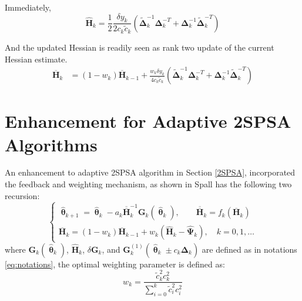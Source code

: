 \documentclass[conference]{IEEEtran}
\newcommand{\bG}{\bm{G}}
\newcommand{\bDelta}{\bm{\Delta}}
\newcommand{\oH}{\bm{\overline{H}}}
\newcommand{\ooH}{\bm{\overline{\overline{H}}}}
\newcommand{\hH}{\bm{\hat{H}}}
\newcommand{\hPsi}{\bm{\hat{\Psi}}}
\newcommand{\htheta}{\bm{\hat{\uptheta}}}
\newcommand{\tDelta}{\bm{\tilde{\Delta}}}
\newcommand{\remove}[1]{}
\begin{document}
Immediately,
\begin{equation} \label{eq:HHat}
\hH_k=\frac{1}{2}\frac{\delta y_k}{2c_k\tilde{c}_k}\left( \tDelta_k^{-1}\bDelta_k^{-T}+\bDelta_k^{-1}\tDelta_k^{-T} \right)
\end{equation}

And the updated Hessian is readily seen as rank two update of
the current Hessian estimate.
\begin{align*}
\oH_k
&= (1 - w_k)\oH_{k-1}
   + \frac{w_k \delta y_k}{4c_k\tilde{c}_k}
     (\tDelta_k^{-1}\bDelta_k^{-T}+\bDelta_k^{-1}\tDelta_k^{-T})
\end{align*}

\remove{
Above gives a rank-2 update from $ \oH_{k-1}^{-1} $ to $ \oH_{k}^{-1} $. Write the sequential recursion of the $ \oH_k^{-1} $ as following:
\begin{equation} \label{eq:2SPSASequentialUpdate}
\begin{dcases}
\bm{B}_k^{-1}
&=\frac{k+1}{k}\oH_{k-1}^{-1}-(\frac{k+1}{k})^2\oH_{k-1}^{-1}\tDelta_k^{-1}\\
&~~~\cdot(b_k^{-1}+\frac{k+1}{k}\bDelta_k^{-T}\oH_{k-1}^{-1}\tDelta_k^{-1})^{-1}\bDelta_k^{-T}\oH_{k-1}^{-1}\\
\oH_k^{-1}
&=\bm{B}_k^{-1}-\bm{B}_k^{-1}\bDelta_k^{-1}\\
&~~~\cdot(b_k^{-1}+\tDelta_k^{-T}\bm{B}_k^{-1}\bDelta_k^{-1})^{-1}\tDelta_k^{-T}\bm{B}_k^{-1}
\end{dcases}
\end{equation}
where
\begin{equation}\label{eq:2SPSAB}
\bm{B}_k=\frac{k}{k+1}\oH_{k-1}+b_k\tDelta_k^{-1}\bDelta_k^{-T}
\end{equation}

Now we analyze the FLOPs of the sequential update \ref{eq:2SPSASequentialUpdate}, compared with the original algorithm \ref{eq:Adaptation}:
}


\section{Enhancement for Adaptive 2SPSA Algorithms} \label{Enhanced 2SPSA}
An enhancement to adaptive 2SPSA algorithm in Section \ref{2SPSA}, incorporated the feedback and weighting mechanism, as shown in Spall \cite{Spall2009} has the following two recursion:
\begin{equation} \label{eq:Enhancement}
\begin{cases}
	\htheta_{k+1}=\htheta_k-a_k\ooH_k^{-1} \bG_k(\htheta_k),\qquad \bm{\ooH}_k=f_k(\oH_k)\\
	\oH_k=(1-w_k)\oH_{k-1}+w_k(\hH_k-\hPsi_k), \quad k=0,1,\dots
\end{cases}
\end{equation}
where $\bG_k(\htheta_k)$, $\hH_k$, $\delta\bG_k$, and $\bG_k^{(1)}(\htheta_k\pm c_k\bDelta_k)$ are defined as in notations \ref{eq:notations}, the optimal weighting parameter is defined as:
\begin{equation} \label{eq:weighting}
w_k=\frac{\tilde{c}_k^2c_k^2}{\sum_{i=0}^{k}\tilde{c}_i^2c_i^2}
\end{equation}
\end{document}
